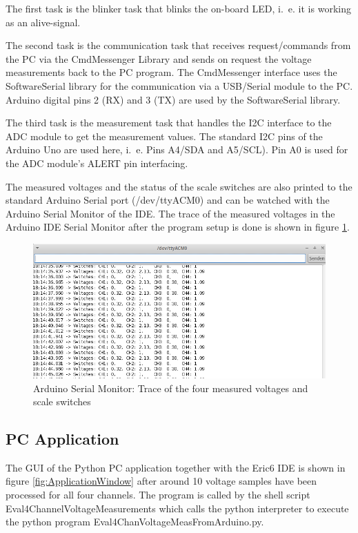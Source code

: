 \documentclass[11pt, oneside]{scrartcl}   	%
\begin{document}
The first task is the blinker task that blinks the on-board LED, i.~e. it is working as an alive-signal.

The second task is the communication task that receives request/commands from the PC via the CmdMessenger Library and sends on request the voltage measurements
back to the PC program. The CmdMessenger interface uses the SoftwareSerial library for the communication via a USB/Serial module to the PC. 
Arduino digital pins 2 (RX) and 3 (TX) are used by the SoftwareSerial library.

The third task is the measurement task that handles the I2C interface to the ADC module to get the measurement values. The standard I2C pins of the Arduino Uno are used here, i.~e. Pins A4/SDA and A5/SCL). Pin A0 is used for the ADC module's ALERT pin interfacing.

The measured voltages and the status of the scale switches are also printed to the standard Arduino Serial port (/dev/ttyACM0) and can be watched with the Arduino Serial Monitor of the IDE.
The trace of the measured voltages in the Arduino IDE Serial Monitor after the program setup is done is shown in figure \ref{fig:ArduinoSerialMonitorTrace}.
\begin{figure}[htbp]
	\centering
	\includegraphics[width=0.9\linewidth]{Figures/ArduinoSerialMonitorTrace.png}
	\caption[Arduino Serial Monitor: Trace of four measured voltages and scale switches]{Arduino Serial Monitor: Trace of the four measured voltages and scale switches}
	\label{fig:ArduinoSerialMonitorTrace}
\end{figure}

\subsection{PC Application}
The GUI of the Python PC application together with the Eric6 IDE is shown in figure \ref{fig:ApplicationWindow} after around 10 voltage samples have been processed for all four channels.
The program is called by the shell script Eval4ChannelVoltageMeasurements which calls the python interpreter to execute the python program Eval4ChanVoltageMeasFromArduino.py.\\
\end{document}

